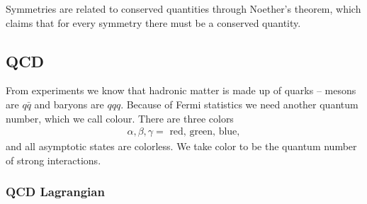 \documentclass[11pt]{article}
\begin{document}
\begin{multicols}{2}
\begin{flushleft}
Symmetries are related to conserved quantities through Noether's theorem, which claims that for every symmetry there must be a conserved quantity.
\end{flushleft}



\subsection{QCD}
\begin{flushleft}
From experiments we know that hadronic matter is made up of quarks -- mesons are $q \bar{q}$ and baryons are $qqq$. Because of Fermi statistics we need another quantum number, which we call colour. There are three colors
\begin{align*}
\alpha, \beta, \gamma = \text{ red, green, blue},
\end{align*}
and all asymptotic states are colorless. We take color to be the quantum number of strong interactions.
\end{flushleft}

\subsubsection*{QCD Lagrangian}


\end{multicols}
\end{document}
